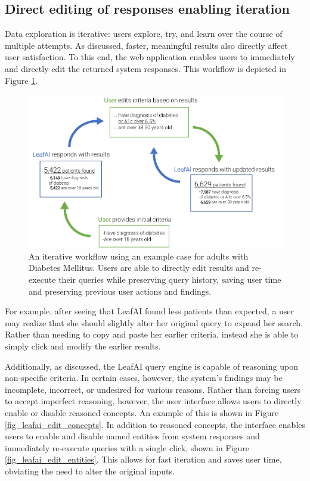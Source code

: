 \documentclass[../main.tex]{subfiles}
\begin{document}
\subsection{Direct editing of responses enabling iteration}

Data exploration is iterative: users explore, try, and learn over the course of multiple attempts. As discussed, faster, meaningful results also directly affect user satisfaction. To this end, the web application enables users to immediately and directly edit the returned system responses. This workflow is depicted in Figure \ref{fig_leafai_feedback_loop}. 

\begin{figure}[h!]
  \centering
  \includegraphics[scale=1]{Figures/8_web_application/leafai_feedback_loop.pdf}  
  \caption{An iterative workflow using an example case for adults with Diabetes Mellitus. Users are able to directly edit results and re-execute their queries while preserving query history, saving user time and preserving previous user actions and findings.}
\label{fig_leafai_feedback_loop}
\end{figure}

For example, after seeing that LeafAI found less patients than expected, a user may realize that she should slightly alter her original query to expand her search. Rather than needing to copy and paste her earlier criteria, instead she is able to simply click and modify the earlier results.

Additionally, as discussed, the LeafAI query engine is capable of reasoning upon non-specific criteria. In certain cases, however, the system's findings may be incomplete, incorrect, or undesired for various reasons. Rather than forcing users to accept imperfect reasoning, however, the user interface allows users to directly enable or disable reasoned concepts. An example of this is shown in Figure \ref{fig_leafai_edit_concepts}. In addition to reasoned concepts, the interface enables users to enable and disable named entities from system responses and immediately re-execute queries with a single click, shown in Figure \ref{fig_leafai_edit_entities}. This allows for fast iteration and saves user time, obviating the need to alter the original inputs.
\end{document}

